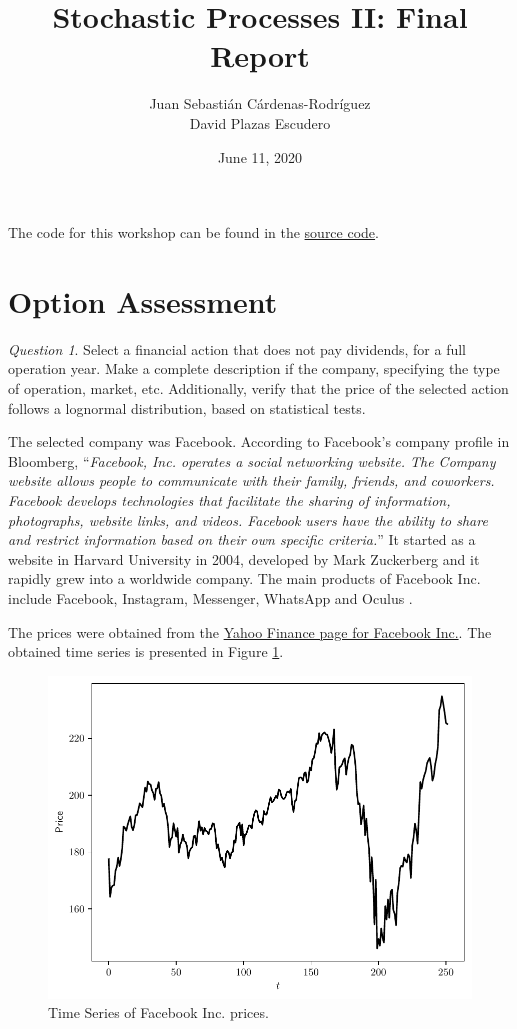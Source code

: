 \documentclass[11pt]{article}
\title{Stochastic Processes II: Final Report}
\author{Juan Sebasti\'an C\'ardenas-Rodríguez \\
       David Plazas Escudero \\
       \scalebox{0.7}{Mathematical Engineering, Universidad EAFIT}}
\date{June 11, 2020}
\theoremstyle{definition}
\theoremstyle{remark}
\theoremstyle{remark}
\newtheorem{question}{Question}
\begin{document}
\maketitle
The code for this workshop can be found in the
\href{https://github.com/Daples/JuanSePlazas/blob/master/201/stochastic-process-2/homework-2/src.py}{source
  code}.

\section*{Option Assessment}
\begin{question}
  Select a financial action that does not pay dividends, for a full operation
  year. Make a complete description if the company, specifying the type of
  operation, market, etc. Additionally, verify that the price of the selected
  action follows a lognormal distribution, based on statistical tests.
\end{question}

The selected company was Facebook. According to Facebook's company profile in
Bloomberg, ``\textit{Facebook, Inc. operates a social networking website. The
  Company website allows people to communicate with their family, friends, and
  coworkers. Facebook develops technologies that facilitate the sharing of
  information, photographs, website links, and videos. Facebook users have the
  ability to share and restrict information based on their own specific
  criteria.}'' \parencite{fb_bloom} It started as a website in Harvard
University in 2004, developed by Mark Zuckerberg \cite{guardian} and it rapidly
grew into a worldwide company. The main products of Facebook Inc. include
Facebook, Instagram, Messenger, WhatsApp and Oculus \parencite{reu}.

The prices were obtained from the
\href{https://finance.yahoo.com/quote/FB/history?p=FB}{Yahoo Finance page for
  Facebook Inc.}. The obtained time series is presented in Figure
\ref{fig:ts_prices}.

\begin{figure}[H]
    \centering
    \includegraphics[scale=0.5]{../plts/prices_ts.pdf}
    \caption{Time Series of Facebook Inc. prices.}
    \label{fig:ts_prices}
\end{figure}
\end{document}
